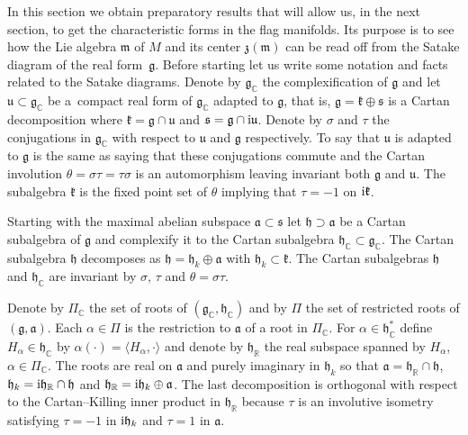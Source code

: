 \documentclass[10pt,a4paper]{amsart}
\numberwithin{equation}{section}
\begin{document}
In this section we obtain preparatory results that will allow us, in the next section, to get the characteristic forms in the flag manifolds. Its purpose is to see how the Lie algebra $\mathfrak{m}$ of $M$ and its center $\mathfrak{z}(\mathfrak{m}) $ can be read off from the Satake diagram of the real form~$\mathfrak{g}$. Before starting let us write some notation and facts related to the Satake diagrams. Denote by $\mathfrak{g}_{\mathbb{C}}$ the complexification of $\mathfrak{g}$ and let $\mathfrak{u}\subset \mathfrak{g}_{\mathbb{C}}$ be a~compact real form of $\mathfrak{g}_{\mathbb{C}}$ adapted to $\mathfrak{g}$, that is, $\mathfrak{g}=\mathfrak{k}\oplus \mathfrak{s}$ is a Cartan decomposition where $\mathfrak{k}=\mathfrak{g}\cap \mathfrak{u}$ and $\mathfrak{s}=\mathfrak{g}\cap {\rm i}\mathfrak{u}$. Denote by $\sigma $ and $\tau $ the conjugations in $\mathfrak{g}_{\mathbb{C}}$ with respect to $\mathfrak{u}$ and $\mathfrak{g}$ respectively. To say that $\mathfrak{u}$ is adapted to $\mathfrak{g}$ is the same as saying that these conjugations commute and the Cartan involution $\theta =\sigma \tau =\tau \sigma $ is an automorphism leaving invariant both $\mathfrak{g}$ and $\mathfrak{u}$. The subalgebra $\mathfrak{k}$ is the fixed point set of $\theta $ implying that $\tau =-1$ on ${\rm i}\mathfrak{k}$.

Starting with the maximal abelian subspace $\mathfrak{a}\subset \mathfrak{s}$ let $\mathfrak{h}\supset \mathfrak{a}$ be a Cartan subalgebra of $\mathfrak{g}$ and complexify it to the Cartan subalgebra $\mathfrak{h}_{\mathbb{C}}\subset \mathfrak{g}_{\mathbb{C}}$. The Cartan subalgebra $\mathfrak{h}$ decomposes as $\mathfrak{h}=\mathfrak{h}_{k}\oplus \mathfrak{a}$ with $\mathfrak{h}_{k}\subset \mathfrak{k}$. The Cartan subalgebras $\mathfrak{h}$ and $\mathfrak{h}_{\mathbb{C}}$ are invariant by $\sigma $, $\tau $ and $\theta =\sigma \tau $.

Denote by $\Pi _{\mathbb{C}}$ the set of roots of $ ( \mathfrak{g}_{\mathbb{C}},\mathfrak{h}_{\mathbb{C}} ) $ and by $\Pi $ the set of restricted roots of $ ( \mathfrak{g},\mathfrak{a} ) $. Each $\alpha\in \Pi $ is the restriction to $\mathfrak{a}$ of a root in $\Pi _{\mathbb{C}}$. For $\alpha \in \mathfrak{h}_{\mathbb{C}}^{\ast }$ define $H_{\alpha}\in \mathfrak{h}_{\mathbb{C}}$ by $\alpha (\cdot) =\langle H_{\alpha },\cdot \rangle $ and denote by $\mathfrak{h}_{\mathbb{R}}$ the real subspace spanned by $H_{\alpha }$, $\alpha \in \Pi _{\mathbb{C}}$. The roots are real on $\mathfrak{a}$ and purely imaginary in $\mathfrak{h}_{k}$ so that $\mathfrak{a}=\mathfrak{h}_{\mathbb{R}}\cap \mathfrak{h}$, $\mathfrak{h}_{k}={\rm i}\mathfrak{h}_{\mathbb{R}}\cap \mathfrak{h}$ and $\mathfrak{h}_{\mathbb{R}}={\rm i}\mathfrak{h}_{k}\oplus \mathfrak{a}$. The last decomposition is orthogonal with respect to the Cartan--Killing inner product in $\mathfrak{h}_{\mathbb{R}}$ because $\tau $ is an involutive isometry satisfying $\tau =-1$ in ${\rm i}\mathfrak{h}_{k}$ and $\tau =1$ in $\mathfrak{a}$.
\end{document}
